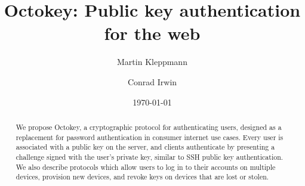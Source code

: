 \documentclass{article}
\begin{document}
\title{Octokey: Public key authentication for the web}
\author{Martin Kleppmann \and Conrad Irwin}
\date{\today}
\maketitle

\begin{abstract}
We propose Octokey, a cryptographic protocol for authenticating users, designed as a replacement for
password authentication in consumer internet use cases. Every user is associated with a public key
on the server, and clients authenticate by presenting a challenge signed with the user's private
key, similar to SSH public key authentication. We also describe protocols which allow users to log
in to their accounts on multiple devices, provision new devices, and revoke keys on devices that are
lost or stolen.
\end{abstract}








{}

\end{document}
